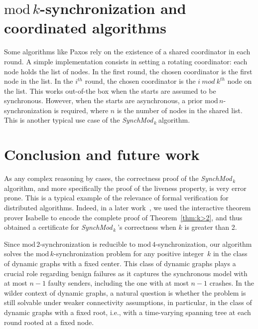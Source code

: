 \documentclass{article}
\newcommand{\SM}{{\em SynchMod}$_{\,k}\ $}
\begin{document}
	

\section{$\mathrm{mod}\,k$-synchronization and coordinated algorithms}

Some algorithms like Paxos rely on the existence of a shared coordinator in each round.
A simple implementation consists in setting a rotating coordinator: 
each node holds the list of nodes. In the first round, the chosen coordinator is the first node in the list.
In the $i^{th}$ round, the chosen coordinator is the $i~mod~k^{th}$ node on the list.
This works out-of-the box when the starts are assumed to be synchronous.
However, when the starts are asynchronous, a prior $\mathrm{mod}\,n$-synchronization is required, where $n$ is the number of nodes in the shared list.
This is another typical use case of the \SM algorithm.

\section{Conclusion and future work}

As any complex reasoning by cases, the correctness proof  of the \SM   algorithm, 
	and more specifically the proof of the liveness property, is very error prone. 
This is a typical example of the relevance of formal verification for distributed algorithms. 
Indeed, in a later work~\cite{}, we used the interactive theorem prover Isabelle to encode the complete proof 
	of Theorem~\ref{thm:k>2}, and thus obtained a certificate for  \SM\!\!'s correctness when $k$ is greater than 2.
	
Since $\mathrm{mod}\,2$-synchronization is reducible to $\mathrm{mod}\,4$-synchronization,
	 our algorithm solves the $\mathrm{mod}\,k$-synchronization problem for any positive integer~$k$
	 in the class of  dynamic  graphs with a fixed center.
This class of dynamic graphs plays a crucial role regarding benign failures as it captures 
	the synchronous model with at most $n-1$ faulty senders, including the one with at most $n-1$ crashes.
In the wilder context of dynamic graphs, a natural question is whether the problem is still solvable 
	under weaker connectivity assumptions, in particular, in the class of dynamic graphs with a fixed root, 
	i.e., with a time-varying spanning tree at each round rooted at a fixed node.

\printbibliography
\end{document}
